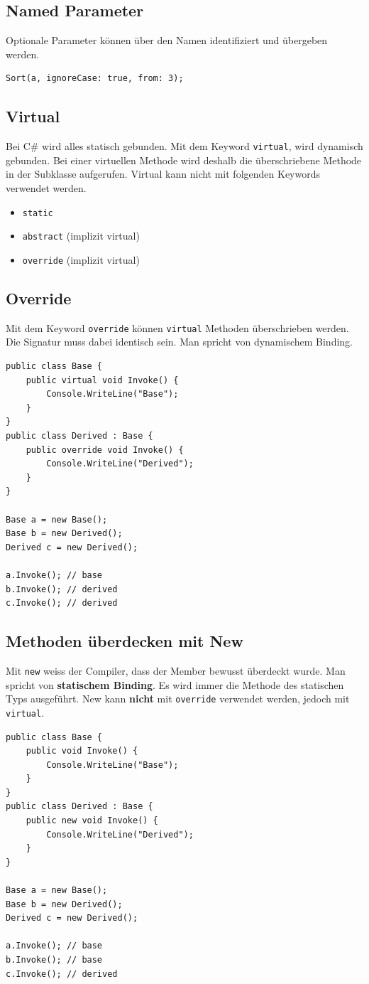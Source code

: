 \documentclass[
a4paper,
oneside,
10pt,
fleqn,
headsepline,
toc=listofnumbered, 
bibliography=totocnumbered]{scrartcl}
\begin{document}
\subsection{Named Parameter}
Optionale Parameter können über den Namen identifiziert und übergeben werden.
\begin{lstlisting}
Sort(a, ignoreCase: true, from: 3);
\end{lstlisting}

\subsection{Virtual}
Bei C\# wird alles statisch gebunden. Mit dem Keyword \lstinline|virtual|, wird dynamisch gebunden. Bei einer virtuellen Methode wird deshalb die überschriebene Methode in der Subklasse aufgerufen. Virtual kann nicht mit folgenden Keywords verwendet werden.
\begin{itemize}
	\item \lstinline|static|
	\item \lstinline|abstract| (implizit virtual)
	\item \lstinline|override| (implizit virtual)
\end{itemize}

\subsection{Override}
Mit dem Keyword \lstinline|override| können \lstinline|virtual| Methoden überschrieben werden. Die Signatur muss dabei identisch sein. Man spricht von dynamischem Binding.


\begin{lstlisting}
public class Base {
	public virtual void Invoke() {
		Console.WriteLine("Base");
	}
}
public class Derived : Base {
	public override void Invoke() {
		Console.WriteLine("Derived");
	}
}

Base a = new Base();
Base b = new Derived();
Derived c = new Derived();

a.Invoke(); // base
b.Invoke(); // derived
c.Invoke(); // derived
\end{lstlisting}

\subsection{Methoden überdecken mit New}
Mit \lstinline|new| weiss der Compiler, dass der Member bewusst überdeckt wurde. Man spricht von \textbf{statischem Binding}. Es wird immer die Methode des statischen Typs ausgeführt. New kann \textbf{nicht} mit \lstinline|override| verwendet werden, jedoch mit \lstinline|virtual|.
\begin{lstlisting} 
public class Base {
	public void Invoke() {
		Console.WriteLine("Base");
	}
}
public class Derived : Base {
	public new void Invoke() {
		Console.WriteLine("Derived");
	}
}

Base a = new Base();
Base b = new Derived();
Derived c = new Derived();

a.Invoke(); // base
b.Invoke(); // base
c.Invoke(); // derived
\end{lstlisting}
\end{document}
